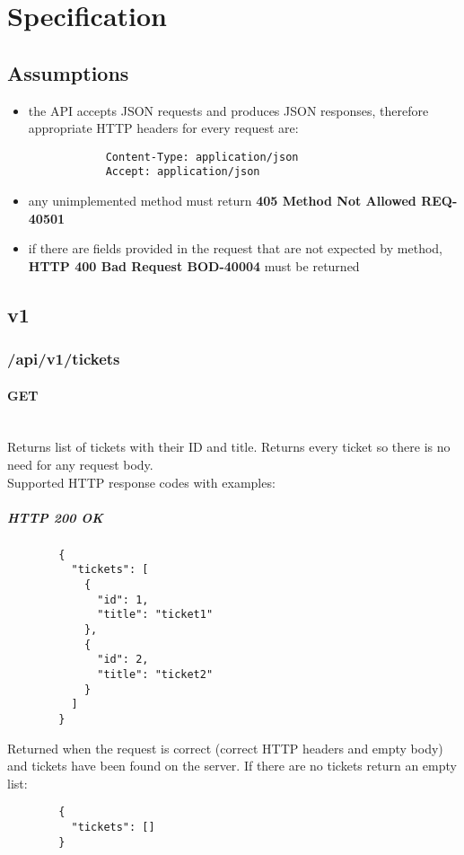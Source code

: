 \documentclass[a4paper]{article}
\newcommand{\newLineParagraph}[1]{\paragraph{#1}\mbox{}\\}
\begin{document}
    \section{Specification}

    \subsection{Assumptions}
    \begin{itemize}
        \item the API accepts JSON requests and produces JSON responses, therefore appropriate HTTP headers for every request are:
        \begin{verbatim}
            Content-Type: application/json
            Accept: application/json
        \end{verbatim}
        \item any unimplemented method must return \textbf{405 Method Not Allowed REQ-40501}
        \item if there are fields provided in the request that are not expected by method, \textbf{HTTP 400 Bad Request BOD-40004} must be returned
    \end{itemize}

    \subsection{v1}
    \subsubsection{/api/v1/tickets}
    \newLineParagraph{GET}
    Returns list of tickets with their ID and title. Returns every ticket so there is no need for any request body. \\
    Supported HTTP response codes with examples:
    \subparagraph{HTTP 200 OK}
    \begin{verbatim}
        {
          "tickets": [
            {
              "id": 1,
              "title": "ticket1"
            },
            {
              "id": 2,
              "title": "ticket2"
            }
          ]
        }
    \end{verbatim}
    Returned when the request is correct (correct HTTP headers and empty body) and tickets have been found on the server. If there are no tickets return an empty list:
    \begin{verbatim}
        {
          "tickets": []
        }
    \end{verbatim}
\end{document}
